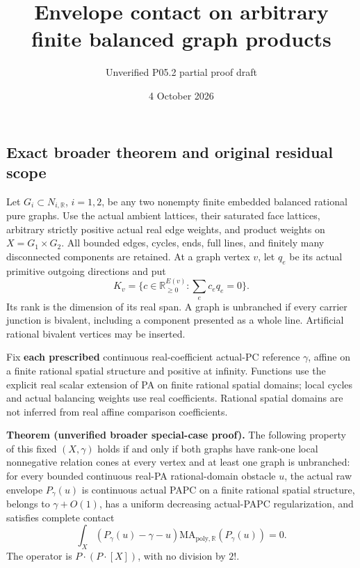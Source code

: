 \documentclass[
  11pt,
]{article}
\title{Envelope contact on arbitrary finite balanced graph products}
\author{Unverified P05.2 partial proof draft}
\date{4 October 2026}
\begin{document}
\maketitle

\subsection{Exact broader theorem and original residual
scope}\label{exact-broader-theorem-and-original-residual-scope}

Let \(G_i\subset N_{i,\mathbb R}\), \(i=1,2\), be any two nonempty
finite embedded balanced rational pure graphs. Use the actual ambient
lattices, their saturated face lattices, arbitrary strictly positive
actual real edge weights, and product weights on \(X=G_1\times G_2\).
All bounded edges, cycles, ends, full lines, and finitely many
disconnected components are retained. At a graph vertex \(v\), let
\(q_e\) be its actual primitive outgoing directions and put \[
 K_v=\{c\in\mathbb R_{\geq0}^{E(v)}:\sum_e c_eq_e=0\}.
                                                               \tag{1}
\] Its rank is the dimension of its real span. A graph is unbranched if
every carrier junction is bivalent, including a component presented as a
whole line. Artificial rational bivalent vertices may be inserted.

Fix \textbf{each prescribed} continuous real-coefficient actual-PC
reference \(\gamma\), affine on a finite rational spatial structure and
positive at infinity. Functions use the explicit real scalar extension
of PA on finite rational spatial domains; local cycles and actual
balancing weights use real coefficients. Rational spatial domains are
not inferred from real affine comparison coefficients.

\textbf{Theorem (unverified broader special-case proof).} The following
property of this fixed \((X,\gamma)\) holds if and only if both graphs
have rank-one local nonnegative relation cones at every vertex and at
least one graph is unbranched: for every bounded continuous real-PA
rational-domain obstacle \(u\), the actual raw envelope \(P_\gamma(u)\)
is continuous actual PAPC on a finite rational spatial structure,
belongs to \(\gamma+O(1)\), has a uniform decreasing actual-PAPC
regularization, and satisfies complete contact \[
 \int_X(P_\gamma(u)-\gamma-u)
       \mathrm{MA}_{\mathrm{poly},\mathbb R}(P_\gamma(u))=0.      \tag{2}
\] The operator is \(P\cdot(P\cdot[X])\), with no division by \(2!\).
\end{document}
